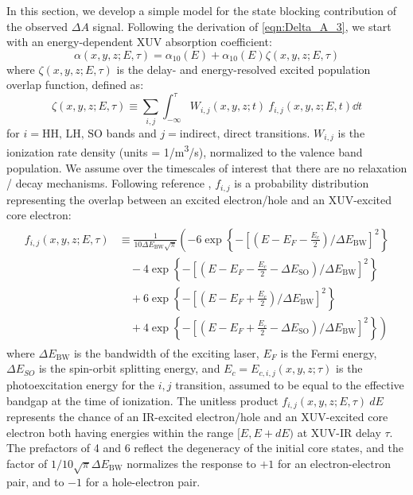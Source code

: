 In this section, we develop a simple model for the state blocking contribution of the observed $\Delta A$ signal. Following the derivation of \cref{eqn:Delta_A_3}, we start with an energy-dependent XUV absorption coefficient:
\begin{equation}
\alpha(x, y, z; E, \tau) = \alpha_{10}(E) + \alpha_{10}(E) \zeta(x, y, z; E, \tau)
\end{equation}
where $\zeta(x, y, z; E, \tau)$ is the delay- and energy-resolved excited population overlap function, defined as:
\begin{equation}
\zeta(x, y, z; E, \tau) \equiv \sum_{i,j} \int_{-\infty}^{\tau} W_{i,j}(x, y, z; t) \ f_{i,j}(x, y, z; E, t) \dd{t}
\end{equation}
for $i=\textrm{HH, LH, SO}$ bands and $j=\textrm{indirect, direct}$ transitions. $W_{i,j}$ is the ionization rate density (units = 1/m\textsuperscript{3}/s), normalized to the valence band population. We assume over the timescales of interest that there are no relaxation / decay mechanisms. Following reference \cite{zurchDirectSimultaneousObservation2017}, $f_{i,j}$ is a probability distribution representing the overlap between an excited electron/hole and an XUV-excited core electron:
\begin{align}
\begin{split}
f_{i,j}(x, y, z; E, \tau) &\equiv \frac{1}{10 \Delta E_{\textrm{BW}} \sqrt{\pi}} \left( -6 \exp \left\{- \left[ \left(E-E_F-\frac{E_c}{2} \right)/\Delta E_{\textrm{BW}} \right]^2 \right\} \right. \\
&\quad - 4 \exp \left\{- \left[ \left(E-E_F-\frac{E_c}{2}-\Delta E_{\textrm{SO}} \right)/\Delta E_{\textrm{BW}} \right]^2 \right\} \\
&\quad + 6 \exp \left\{- \left[ \left(E-E_F+\frac{E_c}{2} \right)/\Delta E_{\textrm{BW}} \right]^2 \right\} \\
&\left. \quad + 4 \exp \left\{- \left[ \left(E-E_F+\frac{E_c}{2}-\Delta E_{\textrm{SO}} \right)/\Delta E_{\textrm{BW}} \right]^2 \right\} \right)
\end{split}
\label{eqn:f_ij}
\end{align}
where $\Delta E_{\textrm{BW}}$ is the bandwidth of the exciting laser, $E_F$ is the Fermi energy, $\Delta E_{SO}$ is the spin-orbit splitting energy, and $E_c = E_{c,i,j}(x, y, z; \tau)$ is the photoexcitation energy for the $i,j$ transition, assumed to be equal to the effective bandgap at the time of ionization. The unitless product $f_{i,j}(x,y,z;E,\tau) \ dE$ represents the chance of an IR-excited electron/hole and an XUV-excited core electron both having energies within the range $[E, E+ dE)$ at XUV-IR delay $\tau$. The prefactors of 4 and 6 reflect the degeneracy of the initial core states, and the factor of $1 / 10 \sqrt{\pi} \Delta E_{\textrm{BW}}$ normalizes the response to $+1$ for an electron-electron pair, and to $-1$ for a hole-electron pair.

